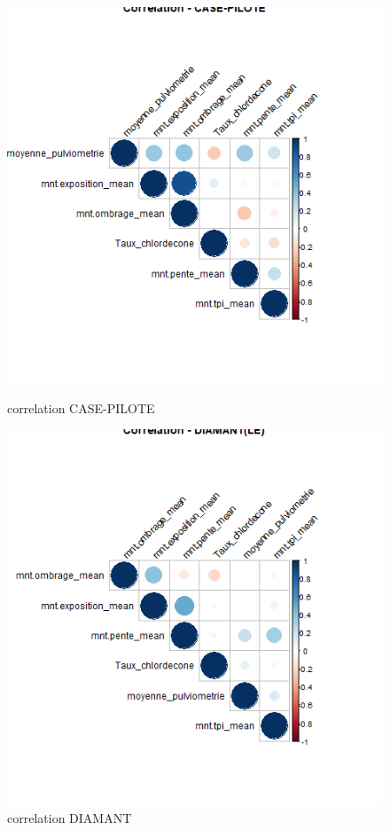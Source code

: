 \documentclass{report}
\begin{document}
\begin{figure}[H]
\begin{minipage}[t]{0.45\linewidth}
\centering
\includegraphics[width =
0.6\linewidth]{correlation_CASE-PILOTE.png}
\caption{correlation CASE-PILOTE}
\end{minipage}
\hfill
\begin{minipage}[t]{0.45\linewidth}
\includegraphics[width = 0.6
\linewidth]{correlation_DIAMANT(LE).png}
\caption{correlation DIAMANT}
\end{minipage}
\end{figure}
\end{document}

